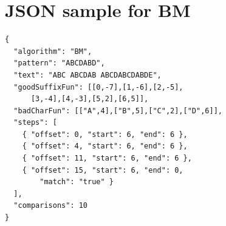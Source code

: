 \documentclass[jou]{apa6}
\begin{document}
\section{JSON sample for BM}

\begin{verbatim}
{
  "algorithm": "BM",
  "pattern": "ABCDABD",
  "text": "ABC ABCDAB ABCDABCDABDE",
  "goodSuffixFun": [[0,-7],[1,-6],[2,-5],
      [3,-4],[4,-3],[5,2],[6,5]],
  "badCharFun": [["A",4],["B",5],["C",2],["D",6]],	
  "steps": [ 
    { "offset": 0, "start": 6, "end": 6 },
    { "offset": 4, "start": 6, "end": 6 },
    { "offset": 11, "start": 6, "end": 6 },
    { "offset": 15, "start": 6, "end": 0, 
        "match": "true" }    
  ],
  "comparisons": 10
}
\end{verbatim}
\end{document}
